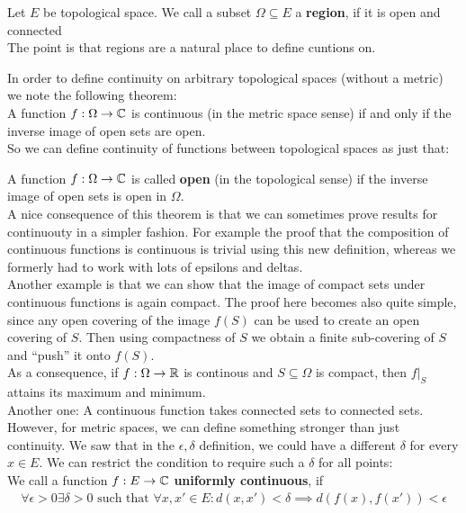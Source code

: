 
Let $E$ be topological space. We call a subset $\Omega \subseteq E$ a \textbf{region}, if it is open and connected\\

The point is that regions are a natural place to define cuntions on.


In order to define continuity on arbitrary topological spaces (without a metric) we note the following theorem:\\
A function $f: \Omega \to \mathbb{C}$ is continuous (in the metric space sense) if and only if the inverse image of open sets are open.\\
So we can define continuity of functions between topological spaces as just that:

A function $f: \Omega \to \mathbb{C}$ is called \textbf{open} (in the topological sense) if the inverse image of open sets is open in $\Omega$.\\

A nice consequence of this theorem is that we can sometimes prove results for continuouty in a simpler fashion. For example the proof that the composition of continuous functions is continuous is trivial using this new definition, whereas we formerly had to work with lots of epsilons and deltas.\\

Another example is that we can show that the image of compact sets under continuous functions is again compact.
The proof here becomes also quite simple, since any open covering of the image $f(S)$ can be used to create an open covering of $S$. Then using compactness of $S$ we obtain a finite sub-covering of $S$ and ``push'' it onto $f(S)$.\\

As a consequence, if $f: \Omega \to \mathbb{R}$ is continous and $S \subseteq \Omega$ is compact, then $f|_S$ attains its maximum and minimum.\\
Another one: A continuous function takes connected sets to connected sets.\\


However, for metric spaces, we can define something stronger than just continuity. We saw that in the $\epsilon, \delta$ definition, we could have a different $\delta$ for every $x \in E$. We can restrict the condition to require such a $\delta$ for all points:\\

We call a function $f: E \to \mathbb{C}$ \textbf{uniformly continuous}, if 
\begin{align*}
		\forall \epsilon > 0 \exists \delta > 0 \text{ such that } \forall x,x' \in E: d(x,x') < \delta	\implies d(f(x),f(x')) < \epsilon
\end{align*}

